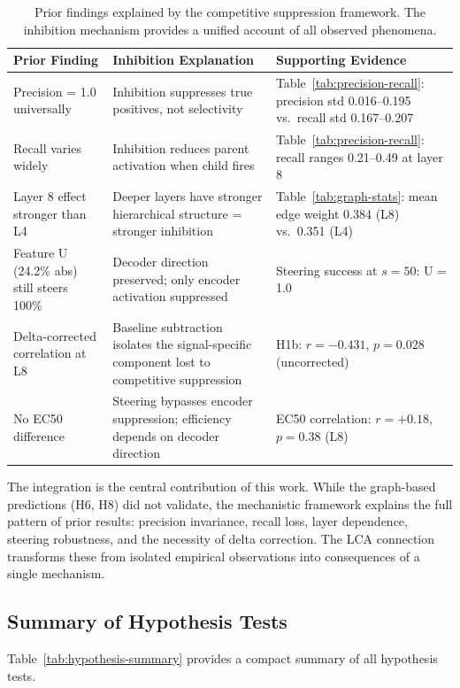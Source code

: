 \documentclass{article}
\begin{document}
\begin{table}[t]
\centering
\caption{Prior findings explained by the competitive suppression framework. The inhibition mechanism provides a unified account of all observed phenomena.}
\label{tab:prior-findings}
\begin{tabular}{p{3.2cm}p{4.8cm}p{4.5cm}}
\toprule
Prior Finding & Inhibition Explanation & Supporting Evidence \\
\midrule
Precision = 1.0 universally & Inhibition suppresses true positives, not selectivity & Table~\ref{tab:precision-recall}: precision std 0.016--0.195 vs.\ recall std 0.167--0.207 \\
Recall varies widely & Inhibition reduces parent activation when child fires & Table~\ref{tab:precision-recall}: recall ranges 0.21--0.49 at layer 8 \\
Layer 8 effect stronger than L4 & Deeper layers have stronger hierarchical structure = stronger inhibition & Table~\ref{tab:graph-stats}: mean edge weight 0.384 (L8) vs.\ 0.351 (L4) \\
Feature U (24.2\% abs) still steers 100\% & Decoder direction preserved; only encoder activation suppressed & Steering success at $s=50$: U = 1.0 \\
Delta-corrected correlation at L8 & Baseline subtraction isolates the signal-specific component lost to competitive suppression & H1b: $r = -0.431$, $p = 0.028$ (uncorrected) \\
No EC50 difference & Steering bypasses encoder suppression; efficiency depends on decoder direction & EC50 correlation: $r = +0.18$, $p = 0.38$ (L8) \\
\bottomrule
\end{tabular}
\end{table}

The integration is the central contribution of this work. While the graph-based predictions (H6, H8) did not validate, the mechanistic framework explains the full pattern of prior results: precision invariance, recall loss, layer dependence, steering robustness, and the necessity of delta correction. The LCA connection transforms these from isolated empirical observations into consequences of a single mechanism.

\subsection{Summary of Hypothesis Tests}
\label{sec:summary}

Table~\ref{tab:hypothesis-summary} provides a compact summary of all hypothesis tests.
\end{document}
